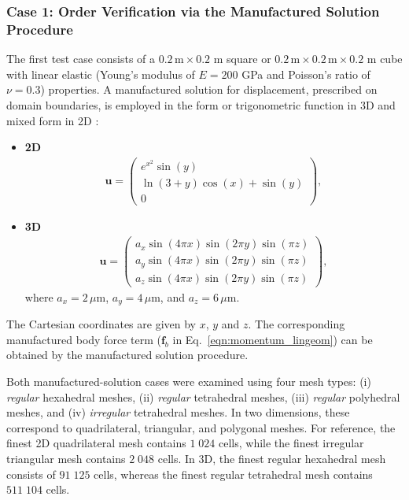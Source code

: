 \documentclass[sn-mathphys,Numbered]{sn-jnl}%
\newcommand{\bb}{\boldsymbol}
\begin{document}
\subsubsection{Case 1: Order Verification via the Manufactured Solution Procedure}
\label{case:mms}
%
The first test case consists of a  $0.2\,\text{m} \times 0.2$ m square or $0.2\,\text{m} \times 0.2\,\text{m} \times 0.2$ m cube with linear elastic (Young's modulus of $E = 200$ GPa and Poisson's ratio of $\nu = 0.3$) properties.
A manufactured solution for displacement, prescribed on domain boundaries, is employed in the form or trigonometric function in 3D \citep{Mazzanti2024} and mixed form in 2D \citep{Castrillo2022}:
%
\begin{itemize}
\item[•] \textbf{2D}
\begin{eqnarray}
	\bb{u} =
	\begin{pmatrix}
 e^{x^2}\sin(y)\\
\ln(3+y)\cos(x)+\sin(y)\\
 0
	\end{pmatrix},
\end{eqnarray}
\item[•] \textbf{3D}
 \begin{eqnarray}
	\bb{u} =
	\begin{pmatrix}
	a_x \sin(4\pi x) \sin(2\pi y) \sin(\pi z) \\
	a_y \sin(4 \pi x) \sin(2 \pi y) \sin(\pi z) \\
	a_z \sin(4 \pi x) \sin(2 \pi y) \sin(\pi z)
	\end{pmatrix},
\end{eqnarray}
%
where $a_x = 2\,\mu$m, $a_y = 4\,\mu$m, and $a_z = 6\,\mu$m.
\end{itemize}
The Cartesian coordinates are given by $x$, $y$ and $z$.
The corresponding manufactured body force term ($\bb{f}_b$ in Eq.~\eqref{eqn:momentum_lingeom}) can be obtained by the manufactured solution procedure.

Both manufactured-solution cases were examined using four mesh types: (i) \emph{regular} hexahedral meshes, (ii) \emph{regular} tetrahedral meshes, (iii) \emph{regular} polyhedral meshes, and (iv) \emph{irregular} tetrahedral meshes. In two dimensions, these correspond to quadrilateral, triangular, and polygonal meshes. For reference, the finest 2D quadrilateral mesh contains $1\;024$ cells, while the finest irregular triangular mesh contains $2\;048$ cells. In 3D, the finest regular hexahedral mesh consists of $91\;125$ cells, whereas the finest regular tetrahedral mesh contains $511\;104$ cells.
\end{document}
